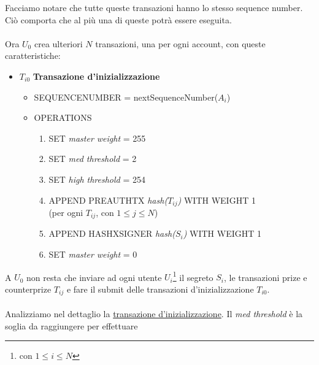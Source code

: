 Facciamo notare che tutte queste transazioni hanno lo stesso sequence number.
Ciò comporta che al più una di queste potrà essere eseguita.
\\
\\
Ora $ U_0 $ crea ulteriori $ N $ transazioni, una per ogni account,
con queste caratteristiche:
\begin{itemize}
	\item \label{trans-init:title}
	      $T_{i0} $ \textbf{Transazione d'inizializzazione}
	      \begin{itemize}
		      \item SEQUENCE\textunderscore NUMBER = nextSequenceNumber($ A_i $)
		      \item OPERATIONS
		            \begin{enumerate}
			            \item \label{trans-init:set-master-weight-255}
			                  SET \textit{master weight} = 255
			            \item \label{trans-init:set-med-thres}
			                  SET \textit{med threshold} = 2
			            \item \label{trans-init:set-high-thres}
			                  SET \textit{high threshold} = 254
			            \item \label{trans-init:set-pre-auth-tx}
			                  APPEND PRE\textunderscore AUTH\textunderscore TX
			                  \textit{hash($ T_{ij} $)} WITH WEIGHT 1
			                  \\(per ogni $ T_{ij} $, con $ 1 \leq j \leq N $)
			            \item \label{trans-init:set-hashx-signer}
			                  APPEND HASHX\textunderscore SIGNER
			                  \textit{hash($ S_{i} $)} WITH WEIGHT 1
			            \item \label{trans-init:set-master-weight-0}
			                  SET \textit{master weight} = 0

		            \end{enumerate}
	      \end{itemize}
\end{itemize}
A $ U_0 $ non resta che inviare ad ogni utente $ U_i $\footnote{con $ 1 \leq i \leq N $}
il segreto $ S_i $, le transazioni prize e counterprize
$ T_{ij} $ e fare il submit delle
transazioni d'inizializzazione $ T_{i0} $.
\\
\\
Analizziamo nel dettaglio la \hyperref[trans-init:title]{transazione d'inizializzazione}.
Il \textit{med threshold} è la soglia da raggiungere per effettuare
